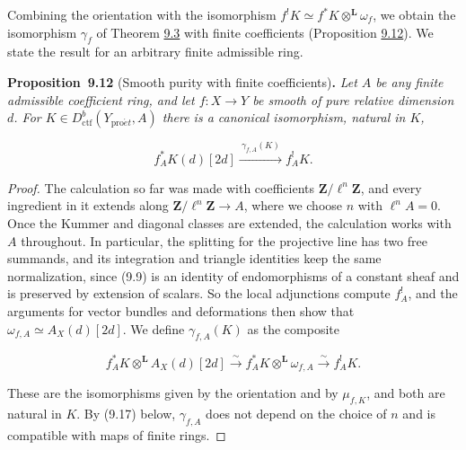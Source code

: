 \documentclass[11pt]{article}
\newenvironment{bpstatement}[2]{\par\addvspace{0.6\baselineskip}\noindent\textbf{#1}#2\textbf{.}\enspace\ignorespaces}
  {\par\addvspace{0.4\baselineskip}}
\newenvironment{bpstatementit}[2]{\begin{bpstatement}{#1}{#2}\itshape\ignorespaces}{\end{bpstatement}}
\begin{document}
Combining the orientation with the isomorphism \(f^!K\simeq f^*K\otimes^{\mathbf L}\omega_f\), we obtain the isomorphism \(\gamma_f\) of Theorem \hyperref[bp11]{9.3} with finite coefficients (Proposition \hyperref[bp39]{9.12}). We state the result for an arbitrary finite admissible ring.

\label{bp39}%
\begin{bpstatementit}{Proposition~9.12}{ (Smooth purity with finite coefficients)}
Let \(A\) be any finite admissible coefficient ring, and let \(f:X\to Y\) be smooth of pure relative dimension \(d\). For \(K\in D^b_{\mathrm{ctf}}(Y_{\mathrm{pro}\acute{e}t},A)\) there is a canonical isomorphism, natural in \(K\),

\[
f_A^{*}K(d)[2d]
\xrightarrow{\ \gamma_{f,A}(K)\ }f_A^{!}K.
\tag{9.15}
\]
\end{bpstatementit}

\begin{proof}[{Proof}]\label{bp40}%
The calculation so far was made with coefficients \(\mathbf Z/\ell^n\mathbf Z\), and every ingredient in it extends along \(\mathbf Z/\ell^n\mathbf Z\to A\), where we choose \(n\) with \(\ell^nA=0\). Once the Kummer and diagonal classes are extended, the calculation works with \(A\) throughout. In particular, the splitting for the projective line has two free summands, and its integration and triangle identities keep the same normalization, since (9.9) is an identity of endomorphisms of a constant sheaf and is preserved by extension of scalars. So the local adjunctions compute \(f_A^!\), and the arguments for vector bundles and deformations then show that \(\omega_{f,A}\simeq A_X(d)[2d]\). We define \(\gamma_{f,A}(K)\) as the composite

\[
f_A^{*}K\otimes^{\mathbf L}A_X(d)[2d]
\xrightarrow{\sim}f_A^{*}K\otimes^{\mathbf L}\omega_{f,A}
\xrightarrow{\sim}f_A^{!}K.
\]

These are the isomorphisms given by the orientation and by \(\mu_{f,K}\), and both are natural in \(K\). By (9.17) below, \(\gamma_{f,A}\) does not depend on the choice of \(n\) and is compatible with maps of finite rings.
\end{proof}


\end{document}
